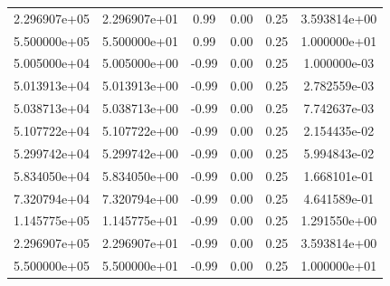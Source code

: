 \documentclass{article}
\begin{document}
\begin{table}[htbp]
\begin{tabular}{cccccc}
2.296907e+05 & 2.296907e+01 & 0.99 & 0.00 & 0.25 & 3.593814e+00 \\
5.500000e+05 & 5.500000e+01 & 0.99 & 0.00 & 0.25 & 1.000000e+01 \\
5.005000e+04 & 5.005000e+00 & -0.99 & 0.00 & 0.25 & 1.000000e-03 \\
5.013913e+04 & 5.013913e+00 & -0.99 & 0.00 & 0.25 & 2.782559e-03 \\
5.038713e+04 & 5.038713e+00 & -0.99 & 0.00 & 0.25 & 7.742637e-03 \\
5.107722e+04 & 5.107722e+00 & -0.99 & 0.00 & 0.25 & 2.154435e-02 \\
5.299742e+04 & 5.299742e+00 & -0.99 & 0.00 & 0.25 & 5.994843e-02 \\
5.834050e+04 & 5.834050e+00 & -0.99 & 0.00 & 0.25 & 1.668101e-01 \\
7.320794e+04 & 7.320794e+00 & -0.99 & 0.00 & 0.25 & 4.641589e-01 \\
1.145775e+05 & 1.145775e+01 & -0.99 & 0.00 & 0.25 & 1.291550e+00 \\
2.296907e+05 & 2.296907e+01 & -0.99 & 0.00 & 0.25 & 3.593814e+00 \\
5.500000e+05 & 5.500000e+01 & -0.99 & 0.00 & 0.25 & 1.000000e+01 \\
\hline
\end{tabular}
\end{table}

\clearpage
\end{document}
